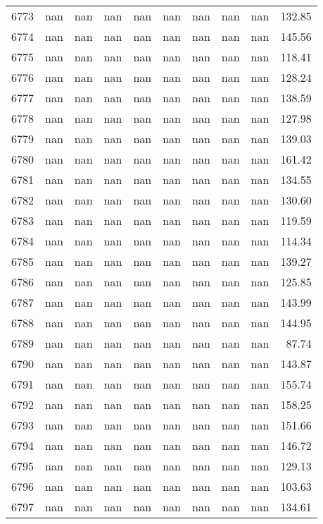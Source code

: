 \begin{tabular}{lrrrrrrrrr}
6773 & nan & nan & nan & nan & nan & nan & nan & nan & 132.85 \\
6774 & nan & nan & nan & nan & nan & nan & nan & nan & 145.56 \\
6775 & nan & nan & nan & nan & nan & nan & nan & nan & 118.41 \\
6776 & nan & nan & nan & nan & nan & nan & nan & nan & 128.24 \\
6777 & nan & nan & nan & nan & nan & nan & nan & nan & 138.59 \\
6778 & nan & nan & nan & nan & nan & nan & nan & nan & 127.98 \\
6779 & nan & nan & nan & nan & nan & nan & nan & nan & 139.03 \\
6780 & nan & nan & nan & nan & nan & nan & nan & nan & 161.42 \\
6781 & nan & nan & nan & nan & nan & nan & nan & nan & 134.55 \\
6782 & nan & nan & nan & nan & nan & nan & nan & nan & 130.60 \\
6783 & nan & nan & nan & nan & nan & nan & nan & nan & 119.59 \\
6784 & nan & nan & nan & nan & nan & nan & nan & nan & 114.34 \\
6785 & nan & nan & nan & nan & nan & nan & nan & nan & 139.27 \\
6786 & nan & nan & nan & nan & nan & nan & nan & nan & 125.85 \\
6787 & nan & nan & nan & nan & nan & nan & nan & nan & 143.99 \\
6788 & nan & nan & nan & nan & nan & nan & nan & nan & 144.95 \\
6789 & nan & nan & nan & nan & nan & nan & nan & nan & 87.74 \\
6790 & nan & nan & nan & nan & nan & nan & nan & nan & 143.87 \\
6791 & nan & nan & nan & nan & nan & nan & nan & nan & 155.74 \\
6792 & nan & nan & nan & nan & nan & nan & nan & nan & 158.25 \\
6793 & nan & nan & nan & nan & nan & nan & nan & nan & 151.66 \\
6794 & nan & nan & nan & nan & nan & nan & nan & nan & 146.72 \\
6795 & nan & nan & nan & nan & nan & nan & nan & nan & 129.13 \\
6796 & nan & nan & nan & nan & nan & nan & nan & nan & 103.63 \\
6797 & nan & nan & nan & nan & nan & nan & nan & nan & 134.61 \\

\end{tabular}
